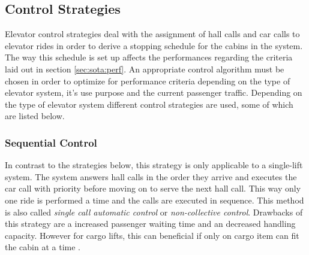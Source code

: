 

\subsection{Control Strategies}
\label{sec:sota:strategies}

Elevator control strategies deal with the assignment of hall calls and car calls to elevator rides in order to derive a stopping schedule for the cabins in the system.
The way this schedule is set up affects
the performances regarding the criteria laid out in section \ref{sec:sota:perf}.
An appropriate control algorithm must be chosen in order to optimize for performance criteria
depending on the type of elevator system, it's use purpose and the current passenger traffic.
Depending on the type of elevator system different control strategies are used, some of which are listed below.

\subsubsection{Sequential Control}
In contrast to the strategies below, 
this strategy is only applicable to a single-lift system.
The system answers hall calls in the order they arrive 
and executes the car call with priority before moving on to serve the next hall call.
This way only one ride is performed a time and the calls are executed in sequence. This method is also called \emph{single call automatic control} or \emph{non-collective control}.
Drawbacks of this strategy are a increased passenger waiting time and an decreased handling capacity.
However for cargo lifts, this can beneficial if only on cargo item can fit the cabin at a time
\autocite[][p.~238]{barney2016handbook}.

